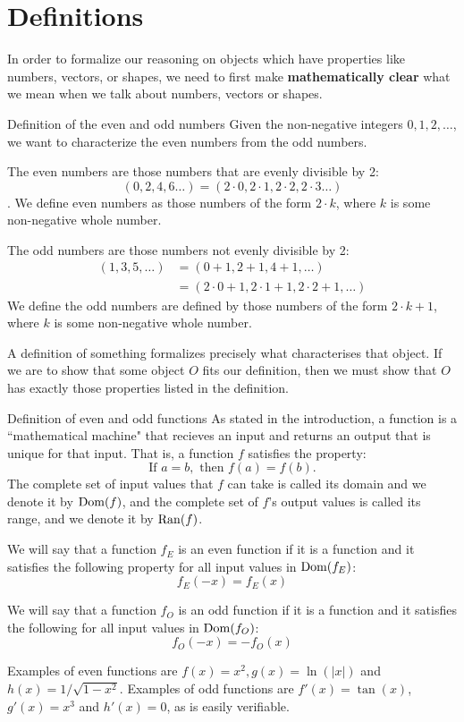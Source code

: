 \section{Definitions}
In order to formalize our reasoning on objects which have properties like
numbers, vectors, or shapes, we need to first make \textbf{mathematically
clear} what we mean when we talk about numbers, vectors or shapes.

\begin{expl}{Definition of the even and odd numbers}
  Given the non-negative integers $0, 1, 2, \ldots$, we want to characterize
  the even numbers from the odd numbers.

  The even numbers are those numbers that are evenly divisible by 2:
  $$(0, 2, 4, 6 \ldots) = (2 \cdot 0, 2 \cdot 1, 2 \cdot 2, 2 \cdot 3 \ldots)$$.
  We define even numbers as those numbers of the form $2 \cdot k$, where $k$
  is some non-negative whole number.


  The odd numbers are those numbers not evenly divisible by 2:
  \begin{align*}
    (1, 3, 5, \ldots) &= (0 + 1, 2 + 1, 4 + 1, \ldots) \\
                      &= (2 \cdot 0 + 1, 2 \cdot 1 + 1, 2 \cdot 2 + 1, \ldots)
  \end{align*}
  We define the odd numbers are defined by those numbers of the form
  $2 \cdot k + 1$, where $k$ is some non-negative whole number.
\end{expl}

A definition of something formalizes precisely what characterises that
object. If we are to show that some object $O$ fits our definition, then
we must show that $O$ has exactly those properties listed in the definition.

\begin{expl}{Definition of even and odd functions}
  As stated in the introduction, a function is a ``mathematical
  machine" that recieves an input and returns an output that is unique for
  that input. That is, a function $f$ satisfies the property:
  $$\text{If } a = b, \text{ then } f(a) = f(b).$$
  The complete set of input values that $f$ can take is called its domain and
  we denote it by $\operatorname{Dom}(f)$, and the complete set of $f$'s output values is
  called its range, and we denote it by $\operatorname{Ran}(f)$.


  We will say that a function $f_E$ is an even function if it is a function
  and it satisfies the following property for all input values in $\operatorname{Dom}(f_E)$:
  $$f_E(-x) = f_E(x)$$

  We will say that a function $f_O$ is an odd function if it is a function and
  it satisfies the following for all input values in $\operatorname{Dom}(f_O)$:
  $$f_O(-x) = -f_O(x)$$

  Examples of even functions are $f(x) = x^2, g(x) = \ln(|x|)$ and
  $h(x) = 1/\sqrt{1-x^2}$. Examples of odd functions are $f'(x) = \tan(x)$,
  $g'(x) = x^3$ and $h'(x) = 0$, as is easily verifiable.
\end{expl}



